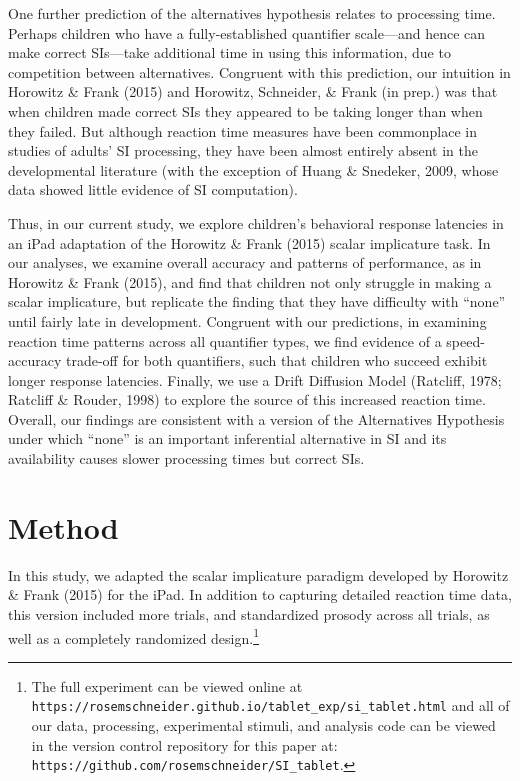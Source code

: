 \documentclass[10pt, letterpaper]{article}
\begin{document}
One further prediction of the alternatives hypothesis relates to
processing time. Perhaps children who have a fully-established
quantifier scale---and hence can make correct SIs---take additional time
in using this information, due to competition between alternatives.
Congruent with this prediction, our intuition in Horowitz \& Frank
(2015) and Horowitz, Schneider, \& Frank (in prep.) was that when
children made correct SIs they appeared to be taking longer than when
they failed. But although reaction time measures have been commonplace
in studies of adults' SI processing, they have been almost entirely
absent in the developmental literature (with the exception of Huang \&
Snedeker, 2009, whose data showed little evidence of SI computation).

Thus, in our current study, we explore children's behavioral response
latencies in an iPad adaptation of the Horowitz \& Frank (2015) scalar
implicature task. In our analyses, we examine overall accuracy and
patterns of performance, as in Horowitz \& Frank (2015), and find that
children not only struggle in making a scalar implicature, but replicate
the finding that they have difficulty with ``none'' until fairly late in
development. Congruent with our predictions, in examining reaction time
patterns across all quantifier types, we find evidence of a
speed-accuracy trade-off for both quantifiers, such that children who
succeed exhibit longer response latencies. Finally, we use a Drift
Diffusion Model (Ratcliff, 1978; Ratcliff \& Rouder, 1998) to explore
the source of this increased reaction time. Overall, our findings are
consistent with a version of the Alternatives Hypothesis under which
``none'' is an important inferential alternative in SI and its
availability causes slower processing times but correct SIs.

\section{Method}\label{method}

In this study, we adapted the scalar implicature paradigm developed by
Horowitz \& Frank (2015) for the iPad. In addition to capturing detailed
reaction time data, this version included more trials, and standardized
prosody across all trials, as well as a completely randomized
design.\footnote{The full experiment can be viewed online at \texttt{https://rosemschneider.github.io/tablet\_exp/si\_tablet.html} and all of our data, processing, experimental stimuli, and analysis code can be viewed in the version control repository for this paper at: \texttt{https://github.com/rosemschneider/SI\_tablet}.}
\end{document}
